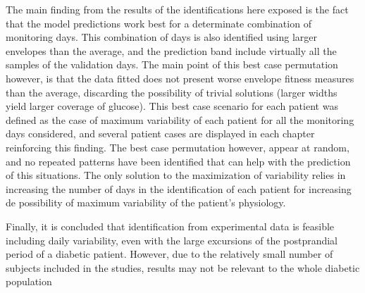 The main finding from the results of the identifications here exposed is the fact that the model predictions work best for a determinate combination of monitoring days. This combination of days is also identified using larger envelopes than the average, and the prediction band include virtually all the samples of the validation days. The main point of this best case permutation however, is that the data fitted does not present worse envelope fitness measures than the average, discarding the possibility of trivial solutions (larger widths yield larger coverage of glucose). This best case scenario for each patient was defined as the case of maximum variability of each patient for all the monitoring days considered, and several patient cases are displayed in each chapter reinforcing this finding. The best case permutation however, appear at random, and no repeated patterns have been identified that can help with the prediction of this situations. The only solution to the maximization of variability relies in increasing the number of days in the identification of each patient for increasing de possibility of maximum variability of the patient's physiology.

Finally, it is concluded that identification from experimental data is feasible including daily variability, even with the large excursions of the postprandial period of a diabetic patient. However, due to the relatively small number of subjects included in the studies, results may not be relevant to the whole diabetic population
